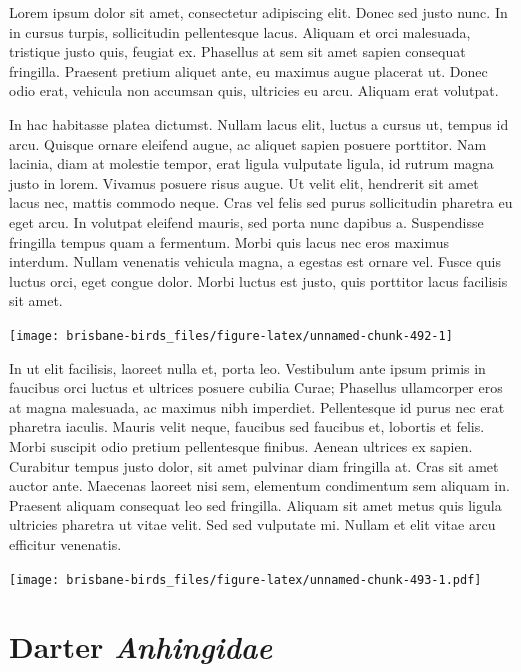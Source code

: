 \documentclass[]{book}
\let\origfigure\figure
\let\endorigfigure\endfigure
\renewenvironment{figure}[1][2] {
  \expandafter\origfigure\expandafter[H]
} {
  \endorigfigure
}
\begin{document}
Lorem ipsum dolor sit amet, consectetur adipiscing elit. Donec sed justo
nunc. In in cursus turpis, sollicitudin pellentesque lacus. Aliquam et
orci malesuada, tristique justo quis, feugiat ex. Phasellus at sem sit
amet sapien consequat fringilla. Praesent pretium aliquet ante, eu
maximus augue placerat ut. Donec odio erat, vehicula non accumsan quis,
ultricies eu arcu. Aliquam erat volutpat.

In hac habitasse platea dictumst. Nullam lacus elit, luctus a cursus ut,
tempus id arcu. Quisque ornare eleifend augue, ac aliquet sapien posuere
porttitor. Nam lacinia, diam at molestie tempor, erat ligula vulputate
ligula, id rutrum magna justo in lorem. Vivamus posuere risus augue. Ut
velit elit, hendrerit sit amet lacus nec, mattis commodo neque. Cras vel
felis sed purus sollicitudin pharetra eu eget arcu. In volutpat eleifend
mauris, sed porta nunc dapibus a. Suspendisse fringilla tempus quam a
fermentum. Morbi quis lacus nec eros maximus interdum. Nullam venenatis
vehicula magna, a egestas est ornare vel. Fusce quis luctus orci, eget
congue dolor. Morbi luctus est justo, quis porttitor lacus facilisis sit
amet.

\begin{figure}
\texttt{[image: brisbane-birds\_files/figure-latex/unnamed-chunk-492-1]} \caption{insert figure caption}\label{fig:unnamed-chunk-492}
\end{figure}

In ut elit facilisis, laoreet nulla et, porta leo. Vestibulum ante ipsum
primis in faucibus orci luctus et ultrices posuere cubilia Curae;
Phasellus ullamcorper eros at magna malesuada, ac maximus nibh
imperdiet. Pellentesque id purus nec erat pharetra iaculis. Mauris velit
neque, faucibus sed faucibus et, lobortis et felis. Morbi suscipit odio
pretium pellentesque finibus. Aenean ultrices ex sapien. Curabitur
tempus justo dolor, sit amet pulvinar diam fringilla at. Cras sit amet
auctor ante. Maecenas laoreet nisi sem, elementum condimentum sem
aliquam in. Praesent aliquam consequat leo sed fringilla. Aliquam sit
amet metus quis ligula ultricies pharetra ut vitae velit. Sed sed
vulputate mi. Nullam et elit vitae arcu efficitur venenatis.

\begin{figure}
\centering
\texttt{[image: brisbane-birds\_files/figure-latex/unnamed-chunk-493-1.pdf]}
\caption{\label{fig:unnamed-chunk-493}insert figure caption}
\end{figure}

\chapter{\texorpdfstring{Darter
\emph{Anhingidae}}{Darter Anhingidae}}\label{darter-anhingidae}
\end{document}
